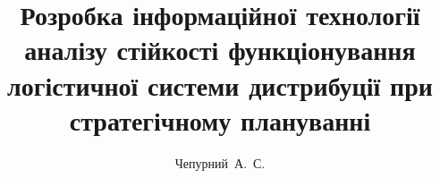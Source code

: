 \title{Розробка інформаційної технології аналізу стійкості функціонування логістичної системи дистрибуції при стратегічному плануванні}
\author{Чепурний~А.~С.}
